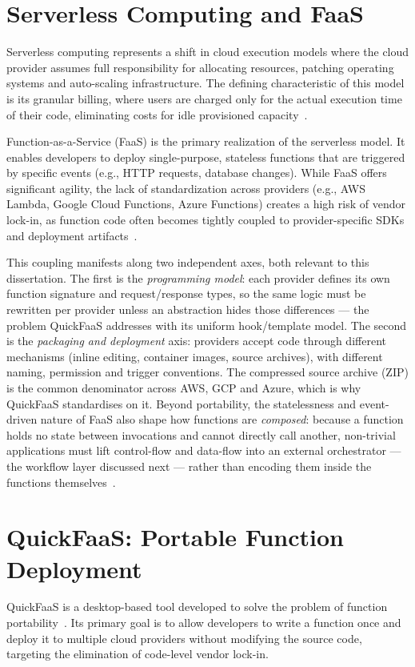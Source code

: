 \section{Serverless Computing and FaaS}
\label{sec:serverless_computing_faas}
Serverless computing represents a shift in cloud execution models where the cloud provider assumes full responsibility for allocating resources, patching operating systems and auto-scaling infrastructure. The defining characteristic of this model is its granular billing, where users are charged only for the actual execution time of their code, eliminating costs for idle provisioned capacity~\cite{serverlessComputing}.

Function-as-a-Service (FaaS) is the primary realization of the serverless model. It enables developers to deploy single-purpose, stateless functions that are triggered by specific events (e.g., HTTP requests, database changes). While FaaS offers significant agility, the lack of standardization across providers (e.g., AWS Lambda, Google Cloud Functions, Azure Functions) creates a high risk of vendor lock-in, as function code often becomes tightly coupled to provider-specific SDKs and deployment artifacts~\cite{rodrigues2022quickfaas}.

This coupling manifests along two independent axes, both relevant to this dissertation. The first
is the \emph{programming model}: each provider defines its own function signature and request/response
types, so the same logic must be rewritten per provider unless an abstraction hides those
differences --- the problem QuickFaaS addresses with its uniform hook/template model. The second is
the \emph{packaging and deployment} axis: providers accept code through different mechanisms
(inline editing, container images, source archives), with different naming, permission and trigger
conventions. The compressed source archive (ZIP) is the common denominator across AWS, GCP and
Azure, which is why QuickFaaS standardises on it. Beyond portability, the statelessness and
event-driven nature of FaaS also shape how functions are \emph{composed}: because a function holds
no state between invocations and cannot directly call another, non-trivial applications must lift
control-flow and data-flow into an external orchestrator --- the workflow layer discussed next ---
rather than encoding them inside the functions themselves~\cite{serverlessComputing}.

\section{QuickFaaS: Portable Function Deployment}
\label{sec:background_quickfaas}
QuickFaaS is a desktop-based tool developed to solve the problem of function portability~\cite{rodrigues2022quickfaas}. Its primary goal is to allow developers to write a function once and deploy it to multiple cloud providers without modifying the source code, targeting the elimination of code-level vendor lock-in.

